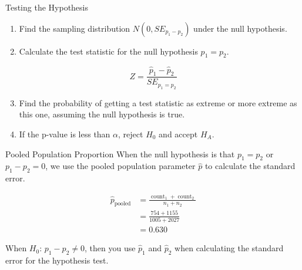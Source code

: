 \documentclass[
  ignorenonframetext,
]{beamer}
\providecommand{\tightlist}{%
  \setlength{\itemsep}{0pt}\setlength{\parskip}{0pt}}\usepackage{longtable,booktabs,array}
\begin{document}
\begin{frame}{Testing the Hypothesis}
\label{testing-the-hypothesis-1}
\begin{enumerate}
\tightlist
\item
  Find the sampling distribution \(N(0, SE_{p_1-p_2})\) under the null
  hypothesis.
\end{enumerate}

\pause

\begin{enumerate}
\setcounter{enumi}{1}
\tightlist
\item
  Calculate the test statistic for the null hypothesis \(p_1=p_2\).
\end{enumerate}

\[
Z=\frac{\hat{p}_1-\hat{p}_2}{SE_{p_1=p_2}}
\]

\pause

\begin{enumerate}
\setcounter{enumi}{2}
\tightlist
\item
  Find the probability of getting a test statistic as extreme or more
  extreme as this one, assuming the null hypothesis is true.
\end{enumerate}

\pause

\begin{enumerate}
\setcounter{enumi}{3}
\tightlist
\item
  If the p-value is less than \(\alpha\), reject \(H_0\) and accept
  \(H_A\).
\end{enumerate}
\end{frame}

\begin{frame}{Pooled Population Proportion}
\label{pooled-population-proportion}
When the null hypothesis is that \(p_1=p_2\) or \(p_1-p_2=0\), we use
the pooled population parameter \(\hat{p}\) to calculate the standard
error.

\[
\begin{aligned}
\hat{p}_{\operatorname{pooled}}&=\frac{\operatorname{count}_1 + \operatorname{count}_2}{n_1+n_2} \\
&=\frac{754 + 1155}{1005 + 2027} \\
&=0.630
\end{aligned}
\]

\pause

When \(H_0\): \(p_1-p_2 \ne 0\), then you use \(\hat{p}_1\) and
\(\hat{p}_2\) when calculating the standard error for the hypothesis
test.
\end{frame}
\end{document}

